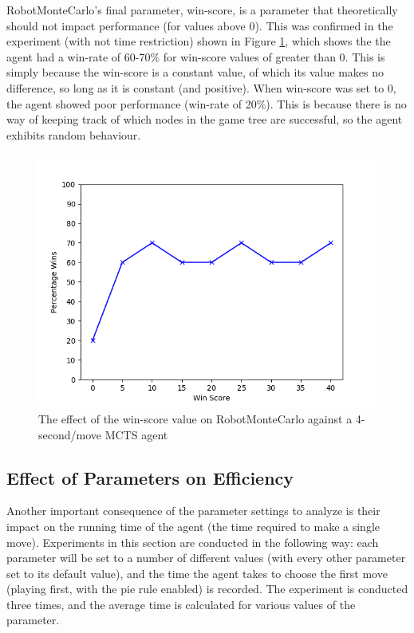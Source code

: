 RobotMonteCarlo's final parameter, win-score, is a parameter that theoretically should not impact performance (for values above 0). This was confirmed in the experiment (with not time restriction) shown in Figure \ref{fig:mcwin_perf}, which shows the the agent had a win-rate of 60-70\% for win-score values of greater than 0. This is simply because the win-score is a constant value, of which its value makes no difference, so long as it is constant (and positive). When win-score was set to 0, the agent showed poor performance (win-rate of 20\%). This is because there is no way of keeping track of which nodes in the game tree are successful, so the agent exhibits random behaviour.
\begin{figure}
    \centering
    \includegraphics[scale = 0.6]{images/MCWIN_PERF.png}
    \caption{The effect of the win-score value on RobotMonteCarlo against a 4-second/move MCTS agent}
    \label{fig:mcwin_perf}
\end{figure}





\subsection{Effect of Parameters on Efficiency}
Another important consequence of the parameter settings to analyze is their impact on the running time of the agent (the time required to make a single move). Experiments in this section are conducted in the following way: each parameter will be set to a number of different values (with every other parameter set to its default value), and the time the agent takes to choose the first move (playing first, with the pie rule enabled) is recorded. The experiment is conducted three times, and the average time is calculated for various values of the parameter.



